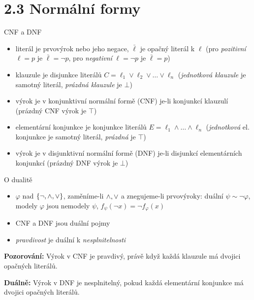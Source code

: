 \documentclass{beamer}
\begin{document}
\section{2.3 Normální formy}


\begin{frame}{CNF a DNF}

\begin{itemize}
    \item \alert{literál} je prvovýrok nebo jeho negace, 
    $\bar \ell$ je \alert{opačný literál} k $\ell$ (pro \emph{pozitivní} $\ell=p$ je $\bar \ell=\neg p$, pro \emph{negativní}  $\ell=\neg p$  je $\bar \ell=p$)
    \item \alert{klauzule} je disjunkce literálů $C=\ell_1\lor\ell_2\lor\dots\lor\ell_n$ 
    (\emph{jednotková klauzule} je samotný literál, \emph{prázdná klauzule} je $\bot$)
    \item výrok je v \alert{konjunktivní normální formě} (\alert{CNF}) je-li konjunkcí klauzulí (prázdný CNF výrok je $\top$)
    \item \alert{elementární konjunkce} je konjunkce literálů $E=\ell_1\land\dots\land\ell_n$ (\emph{jednotková} el. konjunkce je samotný literál,  \emph{prázdná} je $\top$)
    \item výrok je v \alert{disjunktivní normální formě} (\alert{DNF}) je-li disjunkcí elementárních konjunkcí (prázdný DNF výrok je $\bot$)
\end{itemize}

\end{frame}


\begin{frame}{O dualitě}
\vspace{-12pt}

\begin{itemize}
    \item $\varphi$ nad $\{\neg,{\land},{\lor}\}$, zaměníme-li ${\land},{\lor}$ a znegujeme-li prvovýroky: \alert{duální} $\psi\sim\neg\varphi$, modely $\varphi$ jsou nemodely $\psi$, $f_\psi(\neg x)=\neg f_\varphi(x)$
    \item CNF a DNF jsou duální pojmy
    \item \emph{pravdivost} je duální k \emph{nesplnitelnosti} 
\end{itemize}

\textbf{Pozorování:} Výrok v CNF je \alert{pravdivý}, právě když každá klauzule má dvojici opačných literálů.

\textbf{Duálně:} Výrok v DNF je \alert{nesplnitelný}, pokud každá elementární konjunkce má dvojici opačných literálů.
       
\end{frame}
\end{document}
